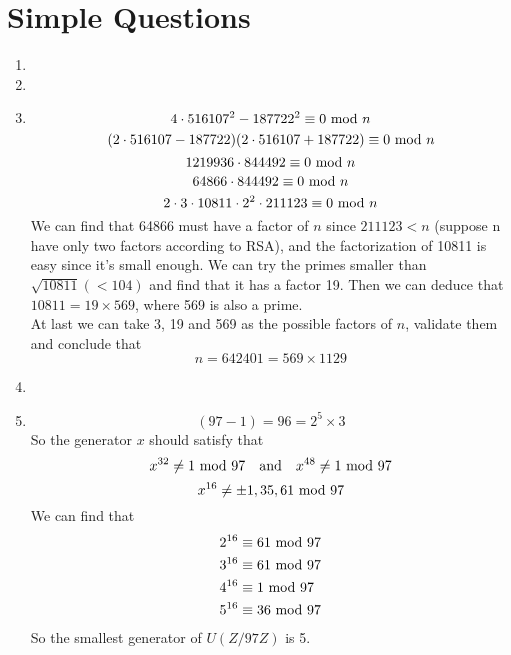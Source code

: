 \documentclass{article}
\renewcommand{\mod}{{\rm\ mod\ }}
\begin{document}
\section{Simple Questions}
\begin{enumerate}
\item
\item
\item
$$4\cdot516107^2-187722^2\equiv0\mod n$$
$$(2\cdot516107-187722)(2\cdot516107+187722)\equiv0\mod n$$
$$1219936\cdot844492\equiv0\mod n$$
$$64866\cdot844492\equiv0\mod n$$
$$2\cdot3\cdot10811\cdot2^2\cdot211123\equiv0\mod n$$
We can find that 64866 must have a factor of $n$ since $211123<n$ (suppose n have only two factors according to RSA), and the factorization of 10811 is easy since it's small enough. We can try the primes smaller than $\sqrt{10811}(<104)$ and find that it has a factor 19. Then we can deduce that $10811=19\times569$, where 569 is also a prime.\\

At last we can take 3, 19 and 569 as the possible factors of $n$,  validate them and conclude that
$$n=642401=569\times1129$$
\item
\item
$$(97-1)=96=2^5\times3$$
So the generator $x$ should satisfy that 
$$x^{32}\neq 1\mod 97\quad{\rm and}\quad x^{48}\neq 1\mod 97$$
$$x^{16}\neq \pm 1,35,61\mod 97$$
We can find that
\begin{align*}
2^{16}&\equiv61\mod97\\
3^{16}&\equiv61\mod97\\
4^{16}&\equiv1\mod97\\
5^{16}&\equiv36\mod97
\end{align*}
So the smallest generator of $U(Z/97Z)$ is 5.
\end{enumerate}
\end{document}
